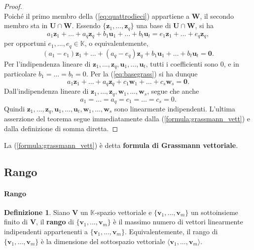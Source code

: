 \documentclass{article}
\theoremstyle{plain}
\theoremstyle{definition}
\newtheorem{defn}{Definizione}[section]
\theoremstyle{remark}
\begin{document}
\begin{proof}
\begin{equation}
    \end{equation}
    Poiché il primo membro della (\ref{eq:quattrodieci}) appartiene a \( \mathbf{W} \), 
    il secondo membro sta in \( \mathbf{U} \cap \mathbf{W} \). 
    Essendo \( \{\mathbf{z}_1, \ldots, \mathbf{z}_q\} \) una base di \( \mathbf{U} \cap \mathbf{W} \), si ha
    \[ a_1\mathbf{z}_1 + \ldots + a_q\mathbf{z}_q + b_1\mathbf{u}_1 + \ldots + b_t\mathbf{u}_t = e_1\mathbf{z}_1 + \ldots + e_q\mathbf{z}_q, \]
    per opportuni \( e_1, ...,  e_q \in \mathbb{K} \), o equivalentemente,
    \[ (a_1 - e_1)\mathbf{z}_1 + \ldots + (a_q - e_q)\mathbf{z}_q + b_1\mathbf{u}_1 + \ldots + b_t\mathbf{u}_t = \mathbf{0}. \]
    Per l'indipendenza lineare di \( \mathbf{z}_1, \ldots, \mathbf{z}_q, \mathbf{u}_1, \ldots, \mathbf{u}_t \), tutti i coefficienti sono $0$, e in particolare \( b_1 = \ldots = b_t = 0 \). 
    Per la (\ref{eq:basegrass}) si ha dunque
    \[ a_1\mathbf{z}_1 + \ldots + a_q\mathbf{z}_q + c_1\mathbf{w}_1 + \ldots + c_s\mathbf{w}_s = \mathbf{0}. \]
    Dall'indipendenza lineare di \( \mathbf{z}_1, \ldots, \mathbf{z}_q, \mathbf{w}_1, \ldots, \mathbf{w}_s \), segue che anche
    \[ a_1 = \ldots = a_q = c_1 = \ldots = c_s = 0. \]
    Quindi \( \mathbf{z}_1, \ldots, \mathbf{z}_q, \mathbf{u}_1, \ldots, \mathbf{u}_t, \mathbf{w}_1, \ldots, \mathbf{w}_s \) sono linearmente indipendenti. 
    L'ultima asserzione del teorema segue immediatamente dalla (\ref{formula:grassmann_vett}) e dalla definizione di somma diretta.
\end{proof}

\vspace{10pt}

La (\ref{formula:grassmann_vett}) è detta \textbf{formula di Grassmann vettoriale}.


\vspace{50pt}
\subsection{Rango}
\vspace{20pt}

\paragraph{Rango}
\begin{bxthm}
\begin{defn}
    Siano $\mathbf{V}$ un $\mathbb{K}$-spazio vettoriale e $\{\mathbf{v}_{1},...,\mathbf{v}_{m}\}$ un sottoinsieme finito di $\mathbf{V}$, 
    il \textbf{rango} di $\{\mathbf{v}_{1},...,\mathbf{v}_{m}\}$ è il massimo numero di vettori linearmente indipendenti 
    appartenenti a $\{\mathbf{v}_{1},...,\mathbf{v}_{m}\}$. 
    Equivalentemente, il rango di $\{\mathbf{v}_{1},...,\mathbf{v}_{m}\}$ è la dimensione del sottospazio vettoriale 
    $\langle \mathbf{v}_{1},...,\mathbf{v}_{m}\rangle $.
\end{defn}
\end{bxthm}
\end{document}
